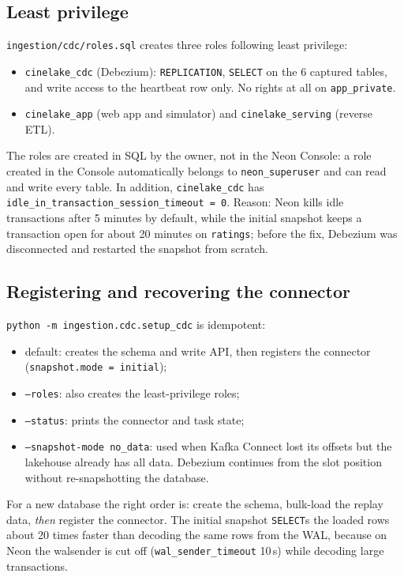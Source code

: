 \documentclass[12pt,a4paper]{article}
\newcommand{\code}[1]{\texttt{#1}}
\begin{document}
\subsection{Least privilege}
\code{ingestion/cdc/roles.sql} creates three roles following least privilege:
\begin{itemize}
  \item \code{cinelake\_cdc} (Debezium): \code{REPLICATION}, \code{SELECT} on the 6 captured tables, and write access
        to the heartbeat row only. No rights at all on \code{app\_private}.
  \item \code{cinelake\_app} (web app and simulator) and \code{cinelake\_serving} (reverse ETL).
\end{itemize}
The roles are created in SQL by the owner, not in the Neon Console: a role created in the Console automatically
belongs to \code{neon\_superuser} and can read and write every table. In addition, \code{cinelake\_cdc} has
\code{idle\_in\_transaction\_session\_timeout = 0}. Reason: Neon kills idle transactions after 5 minutes by default,
while the initial snapshot keeps a transaction open for about 20 minutes on \code{ratings}; before the fix, Debezium
was disconnected and restarted the snapshot from scratch.

\subsection{Registering and recovering the connector}
\code{python -m ingestion.cdc.setup\_cdc} is idempotent:
\begin{itemize}
  \item default: creates the schema and write API, then registers the connector (\code{snapshot.mode = initial});
  \item \code{--roles}: also creates the least-privilege roles;
  \item \code{--status}: prints the connector and task state;
  \item \code{--snapshot-mode no\_data}: used when Kafka Connect lost its offsets but the lakehouse already has all
        data. Debezium continues from the slot position without re-snapshotting the database.
\end{itemize}
For a new database the right order is: create the schema, bulk-load the replay data, \emph{then} register the
connector. The initial snapshot \code{SELECT}s the loaded rows about 20 times faster than decoding the same rows from
the WAL, because on Neon the walsender is cut off (\code{wal\_sender\_timeout} 10\,s) while decoding large
transactions.
\end{document}
